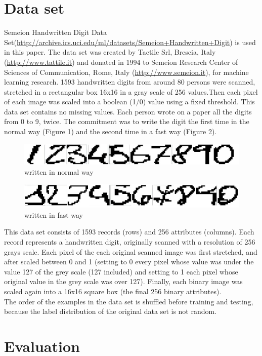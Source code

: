 \documentclass[a4paper,11pt]{article}
\begin{document}
\section{Data set}
Semeion Handwritten Digit Data Set(\url{http://archive.ics.uci.edu/ml/datasets/Semeion+Handwritten+Digit}) is used in this paper. The data set was created by Tactile Srl, Brescia, Italy (\url{http://www.tattile.it}) and donated in 1994 to Semeion Research Center of Sciences of Communication, Rome, Italy (\url{http://www.semeion.it}), for machine learning research.
1593 handwritten digits from around 80 persons were scanned, stretched in a rectangular box 16x16 in a gray scale of 256 values.Then each pixel of each image was scaled into a boolean (1/0) value using a fixed threshold. This data set contains no missing values.
Each person wrote on a paper all the digits from 0 to 9, twice. The commitment was to write the digit the first time in the normal way (Figure 1) and the second time in a fast way (Figure 2).
\begin{figure}
\centering
\includegraphics[width=1.0\textwidth]{clear}
\caption{written in normal way}
\end{figure}

\begin{figure}
\centering
\includegraphics[width=1.0\textwidth]{unclear}
\caption{written in fast way}
\end{figure}
This data set consists of 1593 records (rows) and 256 attributes (columns).
Each record represents a handwritten digit, originally scanned with a resolution of 256 grays scale.
Each pixel of the each original scanned image was first stretched, and after scaled between 0 and 1 (setting to 0 every pixel whose value was under the value 127 of the grey scale (127 included) and setting to 1 each pixel whose original value in the grey scale was over 127).
Finally, each binary image was scaled again into a 16x16 square box (the final 256 binary attributes).\\
The order of the examples in the data set is shuffled before training and testing, because the label distribution of the original data set is not random.
\section{Evaluation}
\end{document}
